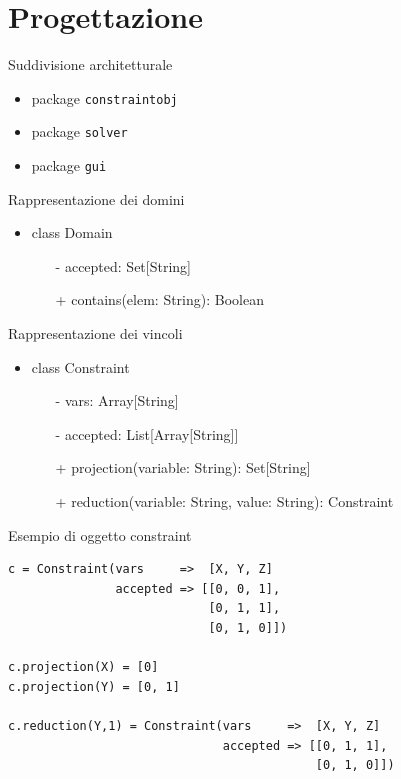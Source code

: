 \section{Progettazione}
\begin{frame}{Suddivisione architetturale}
\begin{itemize}
  \item package \texttt{constraintobj}
  \item package \texttt{solver}
  \item package \texttt{gui}
\end{itemize}
\end{frame}

\begin{frame}{Rappresentazione dei domini}

\begin{itemize}
  \item class Domain
  \begin{itemize}
    \item[-] accepted: Set[String]
    \item[+] contains(elem: String): Boolean
  \end{itemize}
\end{itemize}
\end{frame}

\begin{frame}{Rappresentazione dei vincoli}
\begin{itemize}
  \item class Constraint
  \begin{itemize}
    \item[-] vars: Array[String]
    \item[-] accepted: List[Array[String]]
    \item[+] projection(variable: String): Set[String]
    \item[+] reduction(variable: String, value: String): Constraint
  \end{itemize}
\end{itemize}
\end{frame}

\begin{frame}[fragile]{Esempio di oggetto constraint}
\begin{verbatim}
c = Constraint(vars     =>  [X, Y, Z]
               accepted => [[0, 0, 1],
                            [0, 1, 1],
                            [0, 1, 0]])
                            
c.projection(X) = [0]
c.projection(Y) = [0, 1]

c.reduction(Y,1) = Constraint(vars     =>  [X, Y, Z]
                              accepted => [[0, 1, 1],
                                           [0, 1, 0]])
\end{verbatim}  
\end{frame}

